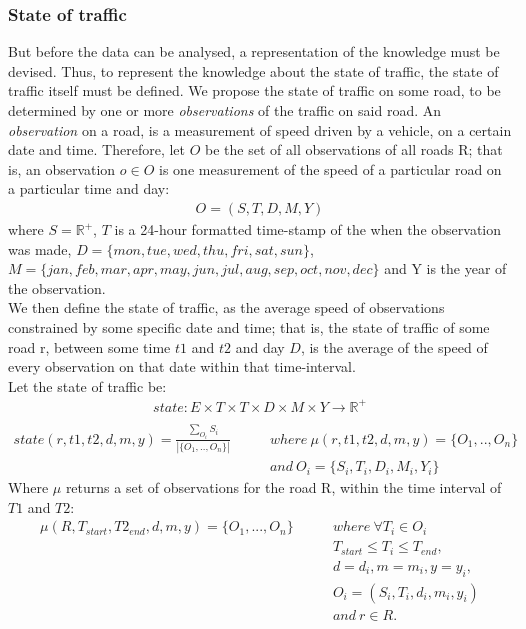 \subsubsection*{State of traffic}
But before the data can be analysed, a representation of the knowledge must be devised. Thus, to represent the knowledge about the state of traffic, the state of traffic itself must be defined. We propose the state of traffic on some road, to be determined by one or more \emph{observations} of the traffic on said road. An \emph{observation} on a road, is a measurement of speed driven by a vehicle, on a certain date and time. Therefore, let $O$ be the set of all observations of all roads R; that is, an observation $o \in O$ is one measurement of the speed of a particular road on a particular time and day:
\begin{align*}
O = (S, T, D, M, Y)
\end{align*}
where $S = \mathbb R^{+}$, $T$ is a 24-hour formatted time-stamp of the when the observation was made, $D= \{mon, tue, wed, thu, fri, sat, sun\}$,\\ $M = \{jan, feb, mar, apr, may, jun, jul, aug, sep, oct, nov, dec\}$ and Y is the year of the observation. \\
We then define the state of traffic, as the average speed of observations constrained by some specific date and time; that is, the state of traffic of some road r, between some time $t1$ and $t2$ and day $D$, is the average of the speed of every observation on that date within that time-interval.\\
Let the state of traffic be:
\begin{align*}
state: E \times T \times T \times D \times M \times Y \rightarrow \mathbb R^+\\
\end{align*}
\begin{align*}
state(r, t1, t2, d, m, y) = \frac{\sum\limits_{O_i} S_i}{|\{O_1,..,O_n\}|} \qquad 
&where \: \mu (r,t1,t2, d, m, y) = \{O_1,..,O_n\} \\
&and \: O_i=\{S_i, T_i, D_i, M_i, Y_i\}
\end{align*}
Where $\mu$ returns a set of observations for the road R, within the time interval of $T1$ and $T2$:
\begin{align*}
\mu(R,T_{start},T2_{end}, d, m, y) = \{O_1,...,O_n\} \qquad &where \: \forall T_i \in O_i\\
&T_{start} \leq T_i \leq T_{end}, \\
&d = d_i, m = m_i, y = y_i, \\
&O_i = (S_i, T_i, d_i, m_i, y_i) \\
&and \: r \in R.\\
\end{align*}
